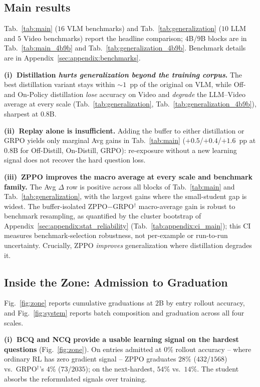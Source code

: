 \documentclass{llmxive}
\begin{document}
\subsection{Main results}
\label{sec:experiments:main}

Tab.~\ref{tab:main} ($16$ VLM benchmarks) and Tab.~\ref{tab:generalization} ($10$ LLM and $5$ Video benchmarks) report the headline comparison; $4$B/$9$B blocks are in Tab.~\ref{tab:main_4b9b} and Tab.~\ref{tab:generalization_4b9b}. Benchmark details are in Appendix~\ref{sec:appendix:benchmarks}.

\textbf{(i)~Distillation \emph{hurts generalization beyond the training corpus}.} The best distillation variant stays within $\sim$$1$~pp of the original on VLM, while Off- and On-Policy distillation \emph{lose} accuracy on Video and \emph{degrade} the LLM--Video average at every scale (Tab.~\ref{tab:generalization}, Tab.~\ref{tab:generalization_4b9b}), sharpest at $0.8$B.

\textbf{(ii)~Replay alone is insufficient.} Adding the buffer to either distillation or GRPO yields only marginal Avg gains in Tab.~\ref{tab:main} ($+0.5$/$+0.4$/$+1.6$~pp at $0.8$B for Off-Distill, On-Distill, GRPO): re-exposure without a new learning signal does not recover the hard question loss.

\textbf{(iii)~ZPPO improves the macro average at every scale and benchmark family.} The Avg $\Delta$ row is positive across all blocks of Tab.~\ref{tab:main} and Tab.~\ref{tab:generalization}, with the largest gains where the small-student gap is widest. The buffer-isolated ZPPO$-$GRPO$^{\dagger}$ macro-average gain is robust to benchmark resampling, as quantified by the cluster bootstrap of Appendix~\ref{sec:appendix:stat_reliability} (Tab.~\ref{tab:appendix:ci_main}); this CI measures benchmark-selection robustness, not per-example or run-to-run uncertainty. Crucially, ZPPO \emph{improves} generalization where distillation degrades it.

\subsection{Inside the Zone: Admission to Graduation}
\label{sec:experiments:zone}

Fig.~\ref{fig:zone} reports cumulative graduations at $2$B by entry rollout accuracy, and Fig.~\ref{fig:system} reports batch composition and graduation across all four scales.

\textbf{(i)~BCQ and NCQ provide a usable learning signal on the hardest questions} (Fig.~\ref{fig:zone}). On entries admitted at $0\%$ rollout accuracy -- where ordinary RL has zero gradient signal -- ZPPO graduates $28\%$ ($432$/$1568$) vs.\ GRPO$^{\dagger}$'s $4\%$ ($73$/$2035$); on the next-hardest, $54\%$ vs.\ $14\%$. The student absorbs the reformulated signals over training.
\end{document}
